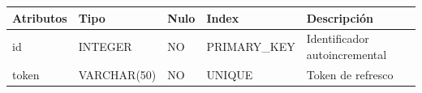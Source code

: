 \documentclass[12pt,a4paperpaper,]{report}
\begin{document}
\begin{longtable}[]{@{}lllll@{}}
\toprule
\begin{minipage}[b]{0.21\columnwidth}\raggedright\strut
Atributos\strut
\end{minipage} & \begin{minipage}[b]{0.19\columnwidth}\raggedright\strut
Tipo\strut
\end{minipage} & \begin{minipage}[b]{0.16\columnwidth}\raggedright\strut
Nulo\strut
\end{minipage} & \begin{minipage}[b]{0.19\columnwidth}\raggedright\strut
Index\strut
\end{minipage} & \begin{minipage}[b]{0.11\columnwidth}\raggedright\strut
Descripción\strut
\end{minipage}\tabularnewline
\midrule
\endhead
\begin{minipage}[t]{0.21\columnwidth}\raggedright\strut
id\strut
\end{minipage} & \begin{minipage}[t]{0.19\columnwidth}\raggedright\strut
INTEGER\strut
\end{minipage} & \begin{minipage}[t]{0.16\columnwidth}\raggedright\strut
NO\strut
\end{minipage} & \begin{minipage}[t]{0.19\columnwidth}\raggedright\strut
PRIMARY\_KEY\strut
\end{minipage} & \begin{minipage}[t]{0.11\columnwidth}\raggedright\strut
Identificador autoincremental\strut
\end{minipage}\tabularnewline
\begin{minipage}[t]{0.21\columnwidth}\raggedright\strut
token\strut
\end{minipage} & \begin{minipage}[t]{0.19\columnwidth}\raggedright\strut
VARCHAR(50)\strut
\end{minipage} & \begin{minipage}[t]{0.16\columnwidth}\raggedright\strut
NO\strut
\end{minipage} & \begin{minipage}[t]{0.19\columnwidth}\raggedright\strut
UNIQUE\strut
\end{minipage} & \begin{minipage}[t]{0.11\columnwidth}\raggedright\strut
Token de refresco\strut
\end{minipage}\tabularnewline

\end{longtable}
\end{document}
